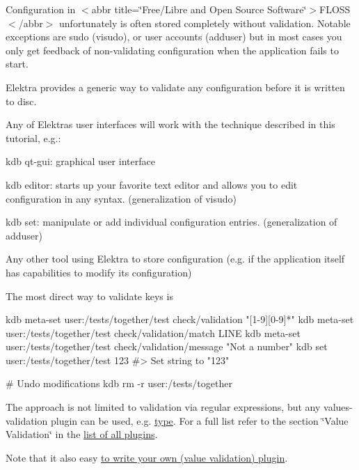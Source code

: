 Configuration in $<$abbr title=\char`\"{}\+Free/\+Libre and Open Source Software\char`\"{}$>$F\+L\+O\+SS$<$/abbr$>$ unfortunately is often stored completely without validation. Notable exceptions are sudo ({\ttfamily visudo}), or user accounts ({\ttfamily adduser}) but in most cases you only get feedback of non-\/validating configuration when the application fails to start.

Elektra provides a generic way to validate any configuration before it is written to disc.

Any of Elektra\textquotesingle{}s user interfaces will work with the technique described in this tutorial, e.\+g.\+:


\begin{DoxyEnumerate}
\item {\ttfamily kdb qt-\/gui}\+: graphical user interface
\item {\ttfamily kdb editor}\+: starts up your favorite text editor and allows you to edit configuration in any syntax. (generalization of {\ttfamily visudo})
\item {\ttfamily kdb set}\+: manipulate or add individual configuration entries. (generalization of {\ttfamily adduser})
\item Any other tool using Elektra to store configuration (e.\+g. if the application itself has capabilities to modify its configuration)
\end{DoxyEnumerate}

The most direct way to validate keys is


\begin{DoxyCode}
kdb meta-set user:/tests/together/test check/validation "[1-9][0-9]*"
kdb meta-set user:/tests/together/test check/validation/match LINE
kdb meta-set user:/tests/together/test check/validation/message "Not a number"
kdb set user:/tests/together/test 123
#> Set string to "123"

# Undo modifications
kdb rm -r user:/tests/together
\end{DoxyCode}


The approach is not limited to validation via regular expressions, but any values-\/validation plugin can be used, e.\+g. \hyperlink{autotoc_md745_src_plugins_type_README_md}{type}. For a full list refer to the section \char`\"{}\+Value Validation\char`\"{} in the \hyperlink{src_plugins_README_md}{list of all plugins}.

Note that it also easy \hyperlink{doc_tutorials_plugins_md}{to write your own (value validation) plugin}.

